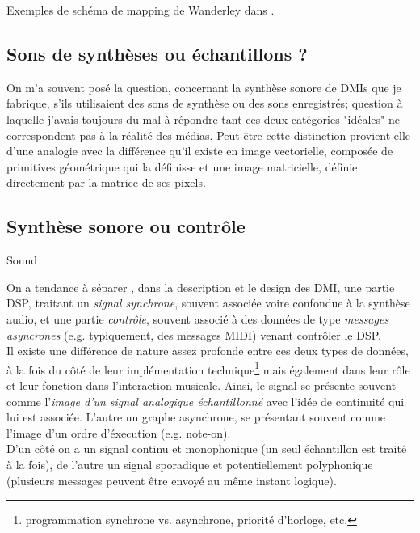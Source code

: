 Exemples de schéma de mapping de Wanderley dans \cite{wanderley_escher-modeling_1998}.

\subsection{Sons de synthèses ou échantillons ?}

On m'a souvent posé la question, concernant la synthèse sonore de DMIs que je fabrique, s'ils utilisaient des sons de synthèse ou des sons enregistrés; question à laquelle j'avais toujours du mal à répondre tant ces deux catégories "idéales" ne correspondent pas à la réalité des médias. 
Peut-être cette distinction provient-elle d'une analogie avec la différence qu'il existe en image vectorielle, composée de primitives géométrique qui la définisse et une image matricielle, définie directement par la matrice de ses pixels.

\subsection{Synthèse sonore ou contrôle}

Sound  \cite{di_scipio_sound_2003}

On a tendance à séparer , dans la description et le design des DMI, une partie \gls{DSP}, traitant un \textit{signal synchrone}, souvent associée voire confondue à la synthèse audio, et une partie \textit{contrôle}, souvent associé à des données de type \textit{messages asyncrones} (e.g. typiquement, des messages MIDI) venant contrôler le DSP.\\
Il existe une différence de nature assez profonde entre ces deux types de données, à la fois du côté de leur implémentation technique\footnote{programmation synchrone vs. asynchrone, priorité d'horloge, etc.} mais également dans leur rôle et leur fonction dans l'interaction musicale. 
Ainsi, le signal se présente souvent comme l'\textit{image d'un signal analogique échantillonné} avec l'idée de continuité qui lui est associée. L'autre un graphe asynchrone, se présentant souvent comme l'image d'un ordre d'éxecution (e.g. note-on). \\
D'un côté on a un signal continu et monophonique (un seul échantillon est traité à la fois), de l'autre un signal sporadique et potentiellement polyphonique (plusieurs messages peuvent être envoyé au même instant logique).\\

